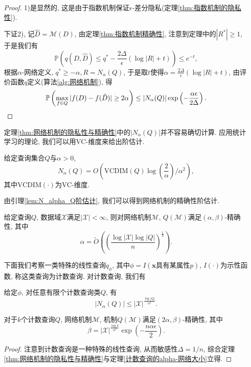 \begin{proof}
  1)是显然的, 这是由于指数机制保证$\epsilon$-差分隐私(定理\ref{thm:指数机制的隐私性}).
  
  下证2), 记$\hat{D} = \mathcal{M}(D)$, 由定理\ref{thm:指数机制精确性}, 注意到定理中的$|R^*|\ge 1$, 于是我们有
  \[
    \mathbb P\left(q(D, \hat{D})\le q^* - \frac{2\Delta}{\epsilon}(\log|R| + t)\right) \le e^{-t},
  \]
  根据$\alpha$-网络定义, $q^*\ge -\alpha, R = N_\alpha(Q)$, 于是取$t$使得$\alpha = \frac{2\Delta}{\epsilon}(\log|R| + t)$, 由评价函数$q$定义(算法\ref{alg:网络机制}), 得
  \[
    \mathbb P\left(\max_{f\in Q}|f(D) - f(\hat{D})|\ge 2\alpha \right) \le |N_\alpha(Q)|\exp\left(-\frac{\alpha\epsilon}{2\Delta}\right). \qedhere
  \]
\end{proof}
定理\ref{thm:网络机制的隐私性与精确性}中的$|N_\alpha(Q)|$并不容易确切计算. 应用统计学习的理论, 我们可以用VC-维度来给出阶估计.
\begin{lem}\label{lem:N_alpha_Q阶估计}
  给定查询集合$Q$与$\alpha > 0$, 
  \[
    N_\alpha(Q) = O\left(\mathrm{VCDIM}(Q)\log(\frac{2}{\alpha})/\alpha^2\right),
  \]
  其中$\mathrm{VCDIM}(\cdot)$为VC-维度.
\end{lem}
由引理\ref{lem:N_alpha_Q阶估计}, 我们可以得到网络机制的精确性阶估计.
\begin{thm}\label{thm:网络机制精确性阶估计}
  给定查询$Q$, 数据域$\mathcal{X}$满足$|\mathcal{X}|<\infty$, 则对网络机制$\mathcal{M}$, $Q(\mathcal{M})$满足$(\alpha, \beta)$-精确性, 其中
  \[
    \alpha = \tilde{O}\left(\left(\frac{\log|\mathcal{X}|\log|Q|}{n}\right)^{\frac{1}{3}}\right). 
  \]
\end{thm}
下面我们考察一类特殊的线性查询$q_\phi$, 其中$\phi = I(\text{$\mathbf{x}$具有某属性$p$})$, $I(\cdot)$为示性函数, 称这类查询为计数查询. 对计数查询, 我们有
\begin{thm}\label{计数查询的alpha-网络大小}
  给定$\phi$, 对任意有限个计数查询类$Q$, 有
  \[
    |N_\alpha(Q)| \le |\mathcal{X}|^{\frac{\log|Q|}{\alpha^2}}.
  \]
\end{thm}
\begin{prop}[网络机制在计数查询上的精确性]\label{prop:网络机制在计数查询上的精确性}
  对于$k$个计数查询$Q$, 网络机制$\mathcal{M}$, 机制$Q(\mathcal{M})$满足$(2\alpha, \beta)$-精确性, 其中
  \[
    \beta = |\mathcal{X}|^{\frac{\log k}{\alpha^2}}\exp\left(-\frac{n\alpha\epsilon}{2}\right).
  \]
\end{prop}
\begin{proof}
  注意到计数查询是一种特殊的线性查询, 从而敏感性$\Delta = 1/n$, 综合定理\ref{thm:网络机制的隐私性与精确性}与定理\ref{计数查询的alpha-网络大小}立得.
\end{proof}


